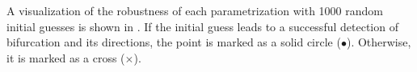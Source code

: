 \documentclass[12pt]{article}
\numberwithin{equation}{section}
\begin{document}
A visualization of the robustness of each parametrization with 1000
random initial guesses is shown in
. If the initial guess leads to a
successful detection of bifurcation and its directions, the point is
marked as a solid circle ($\bullet$). Otherwise, it is marked as a
cross ($\times$).

\begin{figure}[!htbp]
   \centering {}   
\end{figure}
\end{document}
